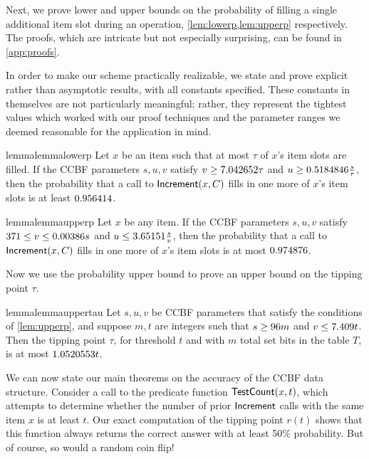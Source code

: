 Next, we prove lower and upper bounds on the probability of filling a single additional item slot during an \Increment{} operation, \cref{lem:lowerp,lem:upperp} respectively.
The proofs, which are intricate but not especially surprising, can be found in \cref{app:proofs}.

In order to make our scheme practically realizable, we state and prove explicit rather than asymptotic results, with all constants specified. These constants in themselves are not particularly meaningful; rather, they represent the tightest values which worked with our proof techniques and the parameter ranges we deemed reasonable for the application in mind.

\begin{restatable}{lemma}{lemmalowerp}\label{lem:lowerp}
    Let $x$ be an item such that at most
    $\tau$ of $x$'s item slots are filled.
    If the CCBF parameters $s,u,v$
    satisfy
    $v \ge 7.042652{} \tau$ and
    $u \ge 0.5184846{} \tfrac{s}{\tau}$,
    then the probability that a call to $\mathsf{Increment}(x,C)$ fills in
    one more of $x$'s item slots is at least
    $0.956414$.
\end{restatable}

\begin{restatable}{lemma}{lemmaupperp}\label{lem:upperp}
    Let $x$ be any item.
    If the CCBF parameters $s,u,v$ satisfy
    $371{} \le v \le 0.00386{} s$ and
    $u \le 3.65151{} \tfrac{s}{v}$,
    then the probability that a call to $\mathsf{Increment}(x,C)$ fills in
    one more of $x$'s item slots is at most
    $0.974876$.
\end{restatable}

Now we use the probability upper bound to prove an upper bound on the tipping point $\tau$.

\begin{restatable}{lemma}{lemmauppertau}\label{lem:uppertau}
    Let $s,u,v$ be CCBF parameters that satisfy the conditions of \cref{lem:upperp},
    and suppose $m,t$ are integers such that
    $s \ge 96{} m$ and
    $v \le 7.409{} t$. Then the tipping point $\tau$, for threshold $t$
    and with $m$ total set bits in the table $T$, is at most
    $1.0520553{} t$.
\end{restatable}

We can now state our main theorems on the accuracy of the CCBF data structure. Consider a call to the predicate function $\mathsf{TestCount}(x,t)$, which attempts to determine whether the number of prior $\mathsf{Increment}{}$ calls with the same item $x$ is at least $t$. Our exact computation of the tipping point $r(t)$ shows that this function always returns the correct answer with at least 50\% probability. But of course, so would a random coin flip!

